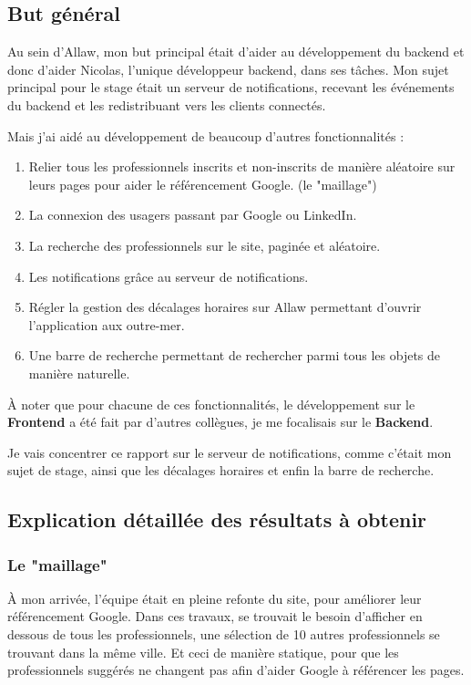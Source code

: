 
\subsection{But général}

Au sein d'Allaw, mon but principal était d'aider au développement du backend
et donc d'aider Nicolas, l'unique développeur backend, dans ses tâches. Mon
sujet principal pour le stage était un serveur de notifications, recevant les
événements du backend et les redistribuant vers les clients connectés.

Mais j'ai aidé au développement de beaucoup d'autres fonctionnalités :

\begin{enumerate}
    \item Relier tous les professionnels inscrits et non-inscrits de manière aléatoire sur
          leurs pages pour aider le référencement Google. (le "maillage")
	\item La connexion des usagers passant par Google ou LinkedIn.
    \item La recherche des professionnels sur le site, paginée et aléatoire.
	\item Les notifications grâce au serveur de notifications.
	\item Régler la gestion des décalages horaires sur Allaw permettant d'ouvrir l'application aux outre-mer.
	\item Une barre de recherche permettant de rechercher parmi tous les objets de manière naturelle.
\end{enumerate}

À noter que pour chacune de ces fonctionnalités, le développement sur le {\bf
Frontend} a été fait par d'autres collègues, je me focalisais sur le {\bf
Backend}.

Je vais concentrer ce rapport sur le serveur de notifications, comme c'était mon
sujet de stage, ainsi que les décalages horaires et enfin la barre de recherche.

\subsection{Explication détaillée des résultats à obtenir}

\subsubsection{Le "maillage"}

À mon arrivée, l'équipe était en pleine refonte du site, pour améliorer leur
référencement Google. Dans ces travaux, se trouvait le besoin d'afficher en
dessous de tous les professionnels, une sélection de 10 autres professionnels
se trouvant dans la même ville. Et ceci de manière statique, pour que les
professionnels suggérés ne changent pas afin d'aider Google à référencer les
pages.

